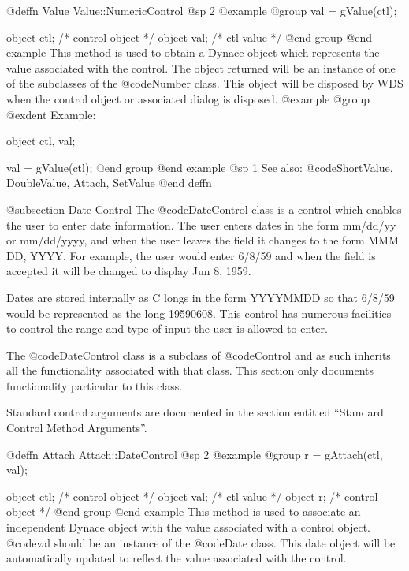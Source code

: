 {@deffn {Value} Value::NumericControl
@sp 2
@example
@group
val = gValue(ctl);

object  ctl;   /*  control object  */
object  val;   /*  ctl value       */
@end group
@end example
This method is used to obtain a Dynace object which represents the value
associated with the control.  The object returned will be an instance of
one of the subclasses of the @code{Number} class.  This object will be
disposed by WDS when the control object or associated dialog is
disposed.
@example
@group
@exdent Example:

object  ctl, val;

val = gValue(ctl);
@end group
@end example
@sp 1
See also:  @code{ShortValue, DoubleValue, Attach, SetValue}
@end deffn









@subsection Date Control
The @code{DateControl} class is a control which enables the user to
enter date information.  The user enters dates in the form mm/dd/yy
or mm/dd/yyyy, and when the user leaves the field it changes to the
form MMM DD, YYYY.  For example, the user would enter 6/8/59 and
when the field is accepted it will be changed to display Jun 8, 1959.

Dates are stored internally as C longs in the form YYYYMMDD so that
6/8/59 would be represented as the long 19590608.  This control has
numerous facilities to control the range and type of input the user is
allowed to enter.

The @code{DateControl} class is a subclass of @code{Control} and as such
inherits all the functionality associated with that class.  This section
only documents functionality particular to this class.

Standard control arguments are documented in the section entitled
``Standard Control Method Arguments''.












@deffn {Attach} Attach::DateControl
@sp 2
@example
@group
r = gAttach(ctl, val);

object  ctl;   /*  control object  */
object  val;   /*  ctl value       */
object  r;     /*  control object  */
@end group
@end example
This method is used to associate an independent Dynace object with the
value associated with a control object.  @code{val} should be an
instance of the @code{Date} class.  This date object will be
automatically updated to reflect the value associated with the control.

}

